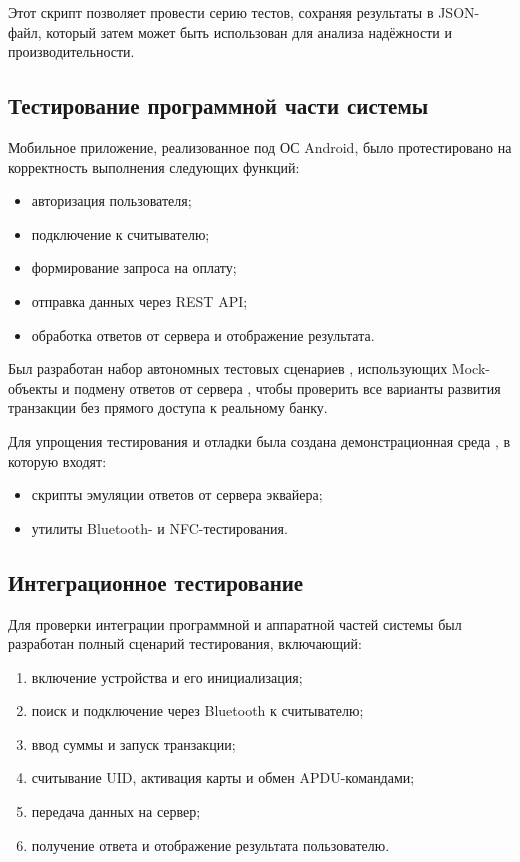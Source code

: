Этот скрипт позволяет провести серию тестов, сохраняя результаты в JSON-файл, который затем может быть использован для анализа надёжности и производительности.



\subsection{Тестирование программной части системы}
Мобильное приложение, реализованное под ОС Android, было протестировано на корректность выполнения следующих функций:

\begin{itemize}
	\item авторизация пользователя;
	\item подключение к считывателю;
	\item формирование запроса на оплату;
	\item отправка данных через REST API;
	\item обработка ответов от сервера и отображение результата.
\end{itemize}

Был разработан набор автономных тестовых сценариев , использующих Mock-объекты и подмену ответов от сервера , чтобы проверить все варианты развития транзакции без прямого доступа к реальному банку.


Для упрощения тестирования и отладки была создана демонстрационная среда , в которую входят:

\begin{itemize}
	\item скрипты эмуляции ответов от сервера эквайера;
	\item утилиты Bluetooth- и NFC-тестирования.
\end{itemize}

\subsection{Интеграционное тестирование}
\label{subsec:test_integr}
Для проверки интеграции программной и аппаратной частей системы был разработан полный сценарий тестирования, включающий:

\begin{enumerate}
	\item включение устройства и его инициализация;
	\item поиск и подключение через Bluetooth к считывателю;
	\item ввод суммы и запуск транзакции;
	\item считывание UID, активация карты и обмен APDU-командами;
	\item передача данных на сервер;
	\item получение ответа и отображение результата пользователю.
\end{enumerate}

